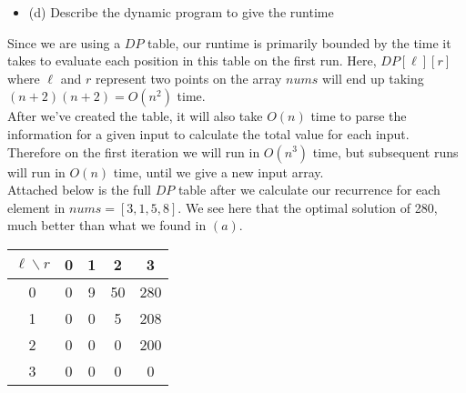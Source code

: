 \documentclass{article}
\begin{document}
\begin{enumerate}
\newpage
\begin{itemize}
    \item (d) Describe the dynamic program to give the runtime
\end{itemize}
Since we are using a $DP$ table, our runtime is primarily bounded by the time it takes to evaluate each position in this table on the first run. Here, $DP[\ell][r]$ where $\ell$ and $r$ represent two points on the array $nums$ will end up taking $(n+2)(n+2) = O(n^2)$ time. \\
\newline 
After we've created the table, it will also take $O(n)$ time to parse the information for a given input to calculate the total value for each input. Therefore on the first iteration we will run in $O(n^3)$ time, but subsequent runs will run in $O(n)$ time, until we give a new input array. \\
\newline 
Attached below is the full $DP$ table after we calculate our recurrence for each element in $nums=[3,1,5,8]$. We see here that the optimal solution of 280, much better than what we found in $(a)$.

\begin{table}[h!]
    \centering
    \begin{tabular}{|c|c|c|c|c|}
        \hline
        $\ell \backslash r$ & 0 & 1 & 2 & 3 \\
        \hline
        0 & 0 & 9 & 50 & 280 \\
        1 & 0 & 0 & 5  & 208 \\
        2 & 0 & 0 & 0  & 200 \\
        3 & 0 & 0 & 0  & 0 \\
        \hline
    \end{tabular}
\end{table}







    
\end{enumerate}
\end{document}
